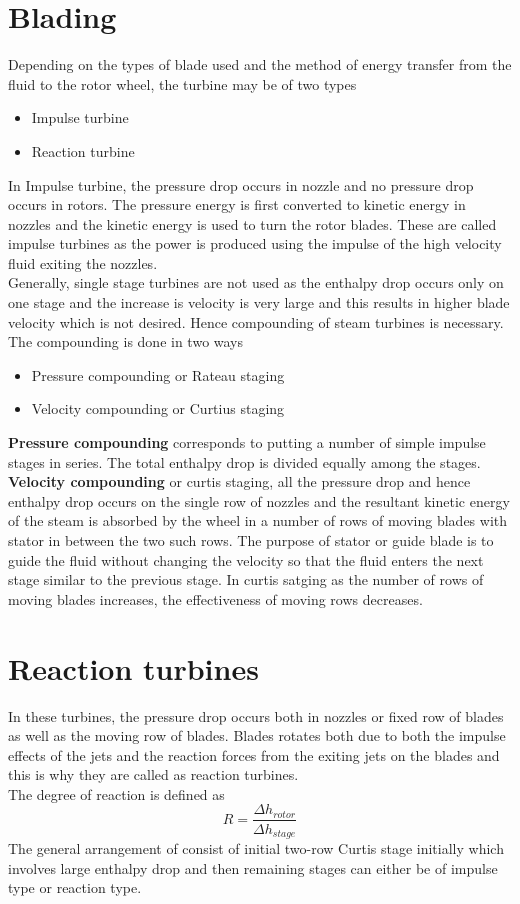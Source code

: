\documentclass[english,11pt]{report}
\begin{document}
\section{Blading}
Depending on the types of blade used and the method of energy transfer from the fluid to the rotor wheel, the turbine may be of two types 
\begin{itemize}
    \item Impulse turbine
    \item Reaction turbine 
\end{itemize}
In Impulse turbine, the pressure drop occurs in nozzle and no pressure drop occurs in rotors. The pressure energy is first converted to kinetic energy in nozzles and the kinetic energy is used to turn the rotor blades. These are called impulse turbines as the power is produced using the impulse of the high velocity fluid exiting the nozzles.\\
Generally, single stage turbines are not used as the enthalpy drop occurs only on one stage and the increase is velocity is very large and this results in higher blade velocity which is not desired. Hence compounding of steam turbines is necessary. The compounding is done in two ways \\
\begin{itemize}
    \item Pressure compounding or Rateau staging 
    \item Velocity compounding or Curtius staging 
\end{itemize}
\textbf{Pressure compounding} corresponds to putting a number of simple impulse stages in series. The total enthalpy drop is divided equally among the stages. 
\textbf{Velocity compounding} or curtis staging, all the pressure drop and hence enthalpy drop occurs on the single row of nozzles and the resultant kinetic energy of the steam is absorbed by the wheel in a number of rows of moving blades with stator in between the two such rows. The purpose of stator or guide blade is to guide the fluid without changing the velocity so that the fluid enters the next stage similar to the previous stage. In curtis satging as the number of rows of moving blades increases, the effectiveness of moving rows decreases.
\section{Reaction turbines}
In these turbines, the pressure drop occurs both in nozzles or fixed row of blades as well as the moving row of blades. Blades rotates both due to both the impulse effects of the jets and the reaction forces from the exiting jets on the blades and this is why they are called as reaction turbines.\\ 
The degree of reaction is defined as 
$$R = \frac{\Delta h_{rotor}}{\Delta h_{stage}}$$
The general arrangement of consist of initial two-row Curtis stage initially which involves large enthalpy drop and then remaining stages can either be of impulse type or reaction type.
\end{document}
